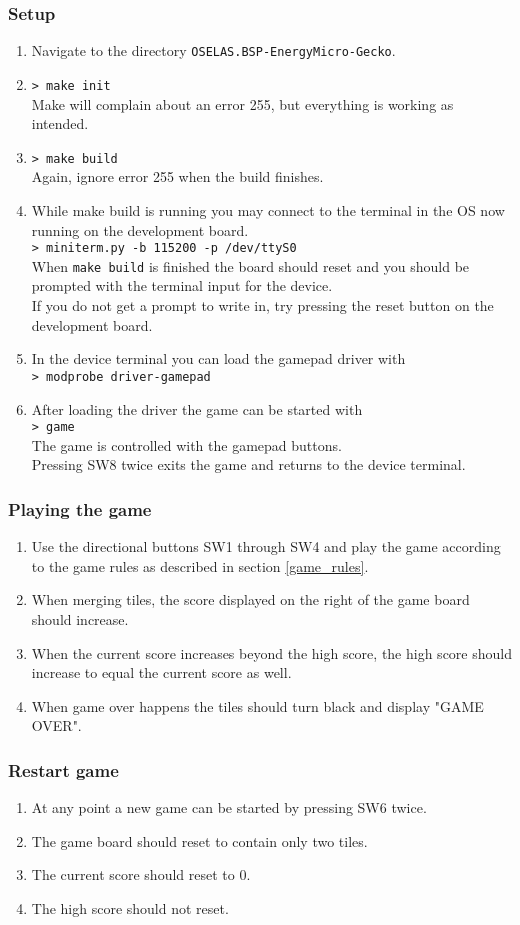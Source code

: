 \subsubsection{Setup}
\begin{enumerate}
    \item   Navigate to the directory \texttt{OSELAS.BSP-EnergyMicro-Gecko}.
    \item   \texttt{> make init}\\
	    Make will complain about an error 255, but everything is working as intended.
    \item   \texttt{> make build}\\
	    Again, ignore error 255 when the build finishes.
    \item   While make build is running you may connect to the terminal in the OS now running on the development board.\\
            \texttt{>  miniterm.py -b 115200 -p /dev/ttyS0}\\
            When \texttt{make build} is finished the board should reset and you should be prompted with the terminal input for the device.\\
            If you do not get a prompt to write in, try pressing the reset button on the development board.
    \item   In the device terminal you can load the gamepad driver with\\
            \texttt{> modprobe driver-gamepad}
    \item   After loading the driver the game can be started with\\
            \texttt{> game}\\
            The game is controlled with the gamepad buttons.\\
            Pressing SW8 twice exits the game and returns to the device terminal.
\end{enumerate}

\subsubsection{Playing the game}
\begin{enumerate}
    \item   Use the directional buttons SW1 through SW4 and play the game according to the game rules as described in section \ref{game_rules}.
    \item   When merging tiles, the score displayed on the right of the game board should increase.
    \item   When the current score increases beyond the high score, the high score should increase to equal the current score as well.
    \item   When game over happens the tiles should turn black and display "GAME OVER".
\end{enumerate}

\subsubsection{Restart game}
\begin{enumerate}
    \item   At any point a new game can be started by pressing SW6 twice.
    \item   The game board should reset to contain only two tiles.
    \item   The current score should reset to 0.
    \item   The high score should not reset.
\end{enumerate}
